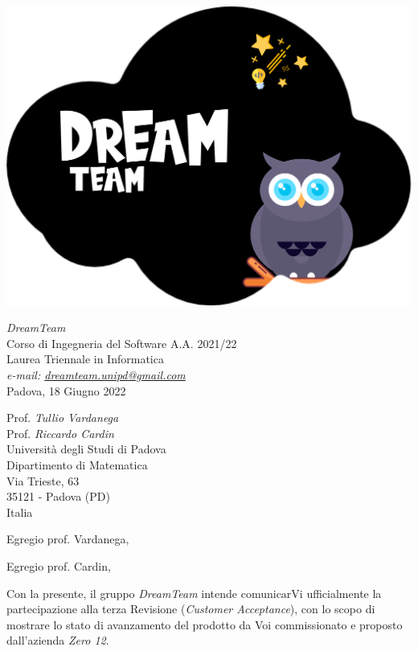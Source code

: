 \documentclass[a4paper]{scrlttr2}
\begin{document}
\includegraphics[scale=0.05]{DreamTeam.png}

\begin{flushright}
\textit{DreamTeam} \\
Corso di Ingegneria del Software A.A. 2021/22 \\
Laurea Triennale in Informatica \\
\textsl{e-mail: \href{mailto:dreamteam.unipd@gmail.com}{dreamteam.unipd@gmail.com}} \\
Padova, 18 Giugno 2022
\end{flushright}

\begin{flushleft}
{Prof. \textit{Tullio Vardanega} \\ Prof. \textit{Riccardo Cardin} \\
Università degli Studi di Padova \\
Dipartimento di Matematica \\
Via Trieste, 63 \\
35121 - Padova (PD) \\ 
Italia}
\end{flushleft}

\vspace*{15px}

Egregio prof. Vardanega,  

Egregio prof. Cardin, 

\vspace*{10px}

Con la presente, il gruppo \textit{DreamTeam} intende comunicarVi ufficialmente la partecipazione alla terza Revisione (\textit{Customer Acceptance}), con lo scopo di mostrare lo stato di avanzamento del prodotto da Voi commissionato e proposto dall'azienda \textit{Zero 12}.
\end{document}
